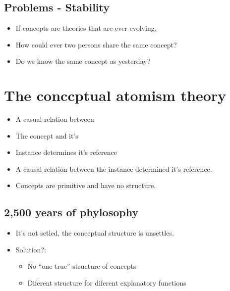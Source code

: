 \subsection{Problems - Stability}
\begin{itemize}
    \item If concepts are theories that are ever evolving, 
    \item How could ever two persons share the same concept?
    \item Do we know the same concept as yesterday? 
\end{itemize}



\section{The conccptual atomism theory}
\begin{itemize}
    \item A casual relation between 
    \item The concept and it's 
    \item Instance determines it's reference 
    \item A causal relation between the instance determined it's reference.
    \item Concepts are primitive and have no structure.
\end{itemize}

\subsection{2,500 years of phylosophy}
\begin{itemize}
    \item It's not setled, the conceptual structure is unsettles.
    \item Solution?:
        \begin{itemize}
            \item No ``one true'' structure of concepts 
            \item Diferent structure for diferent explanatory functions
        \end{itemize}
\end{itemize}

